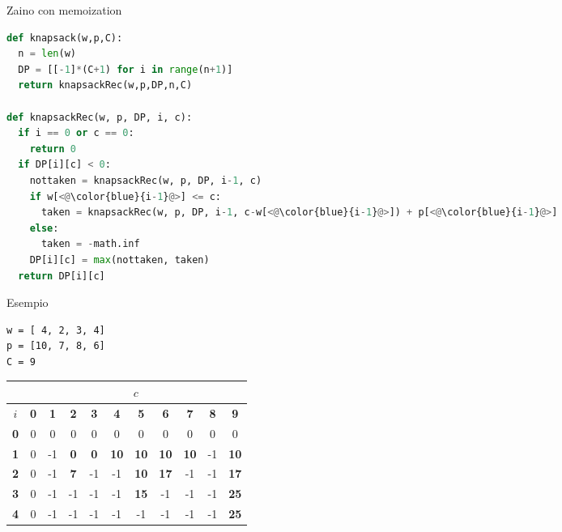 \begin{frame}[fragile,shrink=5]{Zaino con memoization}

\vspace{-12pt}
\begin{lstlisting}[language=python,tabsize=3]
def knapsack(w,p,C):
  n = len(w)
  DP = [[-1]*(C+1) for i in range(n+1)]
  return knapsackRec(w,p,DP,n,C)

def knapsackRec(w, p, DP, i, c):
  if i == 0 or c == 0:
    return 0
  if DP[i][c] < 0:
    nottaken = knapsackRec(w, p, DP, i-1, c)
    if w[<@\color{blue}{i-1}@>] <= c:
      taken = knapsackRec(w, p, DP, i-1, c-w[<@\color{blue}{i-1}@>]) + p[<@\color{blue}{i-1}@>]
    else:
      taken = -math.inf
    DP[i][c] = max(nottaken, taken) 
  return DP[i][c]
\end{lstlisting}

\end{frame}

\begin{frame}[fragile]{Esempio}

\begin{lstlisting}
w = [ 4, 2, 3, 4]
p = [10, 7, 8, 6]
C = 9  
\end{lstlisting}

\bigskip
\begin{tabular}{|c|c|c|c|c|c|c|c|c|c|c|}
\hline
& \multicolumn{10}{c|}{$c$} \\\hline
$i$ & \textbf{0} & \textbf{1} & \textbf{2} & \textbf{3} & \textbf{4} & \textbf{5} & \textbf{6} & \textbf{7} & \textbf{8} & \textbf{9}  \\\hline
\bf{0} & 0 &  0 &  0 &  0 &  0 &  0 &  0 &  0 &  0 &  0 \\\hline
\bf{1} & 0 &  -1 &  \alert{\bf 0} &  \alert{\bf 0} & \alert{\bf 10} & \alert{\bf 10} & \alert{\bf 10} & \alert{\bf 10} & -1 & \alert{\bf 10} \\\hline
\bf{2} & 0 &  -1 &  \alert{\bf 7} & -1 & -1 & \alert{\bf 10} & \alert{\bf 17} & -1 & -1 & \alert{\bf 17} \\\hline
\bf{3} & 0 &  -1 &  -1 &  -1 & -1 & \alert{\bf 15} & -1 & -1 & -1 & \alert{\bf 25} \\\hline
\bf{4} & 0 &  -1 &  -1 &  -1 & -1 & -1 & -1 & -1 & -1 & \alert{\bf 25} \\\hline  
\end{tabular}  
  
\end{frame}

